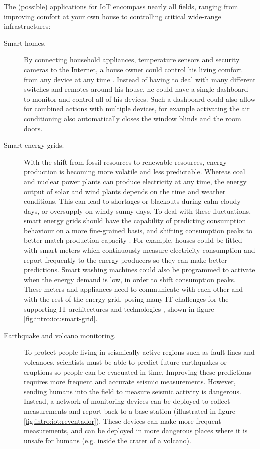The (possible) applications for \gls{IoT} encompass nearly all fields, ranging from improving comfort at your own house to controlling critical wide-range infrastructures:
\begin{description}
\item[Smart homes.] By connecting household appliances, temperature sensors and security cameras to the Internet, a house owner could control his living comfort from any device at any time \cite{chan-smart-home-review}. Instead of having to deal with many different switches and remotes around his house, he could have a single dashboard to monitor and control all of his devices. Such a dashboard could also allow for combined actions with multiple devices, for example activating the air conditioning also automatically closes the window blinds and the room doors.
\item[Smart energy grids.] With the shift from fossil resources to renewable resources, energy production is becoming more volatile and less predictable. Whereas coal and nuclear power plants can produce electricity at any time, the energy output of solar and wind plants depends on the time and weather conditions. This can lead to shortages or blackouts during calm cloudy days, or oversupply on windy sunny days. To deal with these fluctuations, smart energy grids should have the capability of predicting consumption behaviour on a more fine-grained basis, and shifting consumption peaks to better match production capacity  \cite{gungor-smart-grid-survey}. For example, houses could be fitted with smart meters which continuously measure electricity consumption and report frequently to the energy producers so they can make better predictions. Smart washing machines could also be programmed to activate when the energy demand is low, in order to shift consumption peaks. These meters and appliances need to communicate with each other and with the rest of the energy grid, posing many \gls{IT} challenges for the supporting \gls{IT} architectures and technologies \cite{gungor-smart-grid-technologies}, shown in figure \ref{fig:intro:iot:smart-grid}.
\item[Earthquake and volcano monitoring.] To protect people living in seismically active regions such as fault lines and volcanoes, scientists must be able to predict future earthquakes or eruptions so people can be evacuated in time. Improving these predictions requires more frequent and accurate seismic measurements. However, sending humans into the field to measure seismic activity is dangerous. Instead, a network of monitoring devices can be deployed to collect measurements and report back to a base station \cite{reventador} (illustrated in figure \ref{fig:intro:iot:reventador}). These devices can make more frequent measurements, and can be deployed in more dangerous places where it is unsafe for humans (e.g. inside the crater of a volcano).
\end{description}


